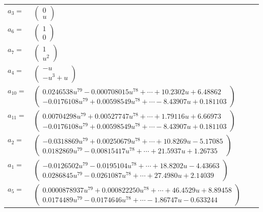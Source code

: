 \documentclass[1p]{elsarticle_modified}
\theoremstyle{definition}
\begin{document}
\begin{tabular}{m{7pt} m{180pt} m{7pt} m{180pt} }
\flushright $a_{3}=$&$\begin{pmatrix}0\\u\end{pmatrix}$ \\
\flushright $a_{6}=$&$\begin{pmatrix}1\\0\end{pmatrix}$ \\
\flushright $a_{7}=$&$\begin{pmatrix}1\\u^2\end{pmatrix}$ \\
\flushright $a_{4}=$&$\begin{pmatrix}- u\\- u^3+u\end{pmatrix}$ \\
\flushright $a_{10}=$&$\begin{pmatrix}0.0246538 u^{79}-0.000708015 u^{78}+\cdots+10.2302 u+6.48862\\-0.0176108 u^{79}+0.00598549 u^{78}+\cdots-8.43907 u+0.181103\end{pmatrix}$ \\
\flushright $a_{11}=$&$\begin{pmatrix}0.00704298 u^{79}+0.00527747 u^{78}+\cdots+1.79116 u+6.66973\\-0.0176108 u^{79}+0.00598549 u^{78}+\cdots-8.43907 u+0.181103\end{pmatrix}$ \\
\flushright $a_{2}=$&$\begin{pmatrix}-0.0318869 u^{79}+0.00250679 u^{78}+\cdots+10.8269 u-5.17085\\0.0182869 u^{79}-0.00815417 u^{78}+\cdots+21.5937 u+1.26735\end{pmatrix}$ \\
\flushright $a_{1}=$&$\begin{pmatrix}-0.0126502 u^{79}-0.0195104 u^{78}+\cdots+18.8202 u-4.43663\\0.0286845 u^{79}-0.0261087 u^{78}+\cdots+27.4980 u+2.14039\end{pmatrix}$ \\
\flushright $a_{5}=$&$\begin{pmatrix}0.0000878937 u^{79}+0.000822250 u^{78}+\cdots+46.4529 u+8.89458\\0.0174489 u^{79}-0.0174646 u^{78}+\cdots-1.86747 u-0.633244\end{pmatrix}$ \\

\end{tabular}
\end{document}
